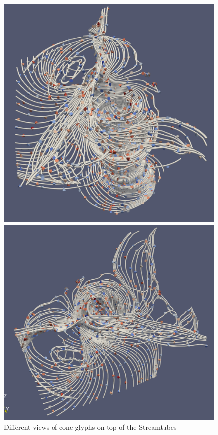\documentclass[a4paper,11pt]{article}
\theoremstyle{mytheor}
\begin{document}
\begin{figure}[!h]
    \centering
    \includegraphics[scale=0.5]{Figures/P2_3_1.PNG}
    
    \vspace{0.5 cm}
    \includegraphics[scale=0.5]{Figures/P2_3_2.PNG}
    \caption{Different views of cone glyphs on top of the Streamtubes}
    \label{p2_3}
\end{figure}
\end{document}

